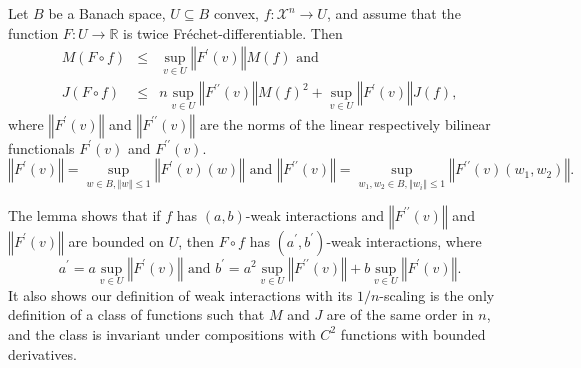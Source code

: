 \documentclass[final,12pt]{colt2018} %
\begin{document}
						\begin{lemma}
							\label{Lemma chain rule}Let $B$ be a Banach space, $U\subseteq B$ convex, $f:%
							\mathcal{X}^{n}\rightarrow U$, and assume that the function $F:U\rightarrow 
							\mathbb{R}
							$ is twice Fr\'{e}chet-differentiable. Then%
							\begin{eqnarray*}
								M\left( F\circ f\right) &\leq &\sup_{v\in U}\left\Vert F^{\prime }\left(
								v\right) \right\Vert M\left( f\right) \text{ and} \\
								J\left( F\circ f\right) &\leq &n\sup_{v\in U}\left\Vert F^{\prime \prime
								}\left( v\right) \right\Vert M\left( f\right) ^{2}+\sup_{v\in U}\left\Vert
								F^{\prime }\left( v\right) \right\Vert J\left( f\right) ,
							\end{eqnarray*}%
							where $\left\Vert F^{\prime }\left( v\right) \right\Vert $ and $\left\Vert
							F^{\prime \prime }\left( v\right) \right\Vert $ are the norms of the linear
							respectively bilinear functionals $F^{\prime }\left( v\right) $ and $%
							F^{\prime \prime }\left( v\right) $.%
							\begin{equation*}
							\left\Vert F^{\prime }\left( v\right) \right\Vert =\sup_{w\in B,\left\Vert
								w\right\Vert \leq 1}\left\Vert F^{\prime }\left( v\right) \left( w\right)
							\right\Vert \text{ and }\left\Vert F^{\prime \prime }\left( v\right)
							\right\Vert =\sup_{w_{1},w_{2}\in B,\left\Vert w_{i}\right\Vert \leq
								1}\left\Vert F^{\prime \prime }\left( v\right) \left( w_{1},w_{2}\right)
							\right\Vert \text{.} 
							\end{equation*}
						\end{lemma}
						
						The lemma shows that if $f$ has $\left( a,b\right) $-weak interactions and $%
						\left\Vert F^{\prime \prime }\left( v\right) \right\Vert $ and $\left\Vert
						F^{\prime }\left( v\right) \right\Vert $ are bounded on $U$, then $F\circ f$
						has $\left( a^{\prime },b^{\prime }\right) $-weak interactions, where%
						\begin{equation*}
						a^{\prime }=a\sup_{v\in U}\left\Vert F^{\prime }\left( v\right) \right\Vert 
						\text{ and }b^{\prime }=a^{2}\sup_{v\in U}\left\Vert F^{\prime \prime
						}\left( v\right) \right\Vert +b\sup_{v\in U}\left\Vert F^{\prime }\left(
						v\right) \right\Vert . 
						\end{equation*}
						It also shows our definition of weak interactions with its $1/n$-scaling is
						the only definition of a class of functions such that $M$ and $J$ are of the same order in $n$, and the class is invariant under compositions with $C^{2}$ functions with bounded derivatives.
						
\end{document}
